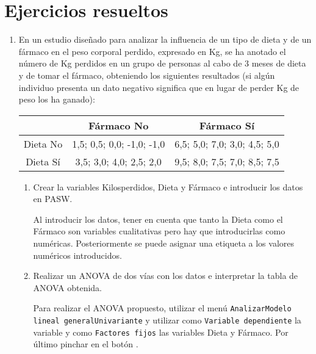 \section{Ejercicios resueltos}
\begin{enumerate}
\item En un estudio diseñado para analizar la influencia de un tipo de dieta y de un fármaco en el peso corporal perdido, expresado en Kg, se ha anotado el número de Kg perdidos en un grupo de personas al cabo de 3 meses de dieta y de tomar el fármaco, obteniendo los siguientes resultados (si algún individuo presenta un dato negativo significa que en lugar de perder Kg de peso los ha ganado):

\begin{center}

\begin{tabular}{|l|l|l|}
\cline{2-3}
\multicolumn{1}{c|}{} & \multicolumn{1}{c|}{Fármaco No} & \multicolumn{1}{c|}{Fármaco Sí} \\
\hline
\multicolumn{1}{|c|}{Dieta No} & \multicolumn{1}{c|}{1,5; 0,5; 0,0; -1,0; -1,0 } & \multicolumn{1}{c|}{6,5; 5,0; 7,0; 3,0; 4,5; 5,0} \\
\hline
\multicolumn{1}{|c|}{Dieta Sí} & \multicolumn{1}{c|}{3,5; 3,0; 4,0; 2,5; 2,0} & \multicolumn{1}{c|}{9,5; 8,0; 7,5; 7,0; 8,5; 7,5} \\
\hline
\end{tabular}

\end{center}

\begin{enumerate}

\item Crear la variables \textsf{Kilosperdidos}, \textsf{Dieta} y \textsf{Fármaco} e introducir los datos en PASW.

\begin{indicacion} {Al introducir los datos, tener en cuenta que tanto la \textsf{Dieta} como el \textsf{Fármaco} son variables cualitativas pero hay que introducirlas como numéricas. Posteriormente se puede asignar una etiqueta a los valores numéricos introducidos.}
\end{indicacion}

\item Realizar un ANOVA de dos vías con los datos e interpretar la tabla de ANOVA obtenida.

\begin{indicacion} {Para realizar el ANOVA propuesto, utilizar el menú \texttt{Analizar\flecha Modelo lineal general\flecha Univariante} y utilizar como \texttt{Variable dependiente} la variable  y como \texttt{Factores fijos} las variables \textsf{Dieta} y \textsf{Fármaco}. Por último pinchar en el botón .


}
\end{indicacion}
\end{enumerate}
\end{enumerate}
